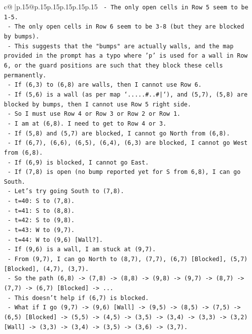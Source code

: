 \documentclass{article}
\begin{document}
{\begin{supertabular}{c@{$\;$}|p{.15\linewidth}@{}p{.15\linewidth}p{.15\linewidth}p{.15\linewidth}p{.15\linewidth}p{.15\linewidth}}
{{{\texttt{  {-} The only open cells in Row 5 seem to be 1{-}5.} \\
\texttt{  {-} The only open cells in Row 6 seem to be 3{-}8 (but they are blocked by bumps).} \\
\texttt{  {-} This suggests that the "bumps" are actually walls, and the map provided in the prompt has a typo where 'p' is used for a wall in Row 6, or the guard positions are such that they block these cells permanently.} \\
\texttt{  {-} If (6,3) to (6,8) are walls, then I cannot use Row 6.} \\
\texttt{  {-} If (5,6) is a wall (as per map `.....\#..\#|`), and (5,7), (5,8) are blocked by bumps, then I cannot use Row 5 right side.} \\
\texttt{  {-} So I must use Row 4 or Row 3 or Row 2 or Row 1.} \\
\texttt{  {-} I am at (6,8). I need to get to Row 4 or 3.} \\
\texttt{  {-} If (5,8) and (5,7) are blocked, I cannot go North from (6,8).} \\
\texttt{  {-} If (6,7), (6,6), (6,5), (6,4), (6,3) are blocked, I cannot go West from (6,8).} \\
\texttt{  {-} If (6,9) is blocked, I cannot go East.} \\
\texttt{  {-} If (7,8) is open (no bump reported yet for S from 6,8), I can go South.} \\
\texttt{  {-} Let's try going South to (7,8).} \\
\texttt{  {-} t=40: S to (7,8).} \\
\texttt{  {-} t=41: S to (8,8).} \\
\texttt{  {-} t=42: S to (9,8).} \\
\texttt{  {-} t=43: W to (9,7).} \\
\texttt{  {-} t=44: W to (9,6) {[}Wall?{]}.} \\
\texttt{  {-} If (9,6) is a wall, I am stuck at (9,7).} \\
\texttt{  {-} From (9,7), I can go North to (8,7), (7,7), (6,7) {[}Blocked{]}, (5,7) {[}Blocked{]}, (4,7), (3,7).} \\
\texttt{  {-} So the path (6,8) {-}> (7,8) {-}> (8,8) {-}> (9,8) {-}> (9,7) {-}> (8,7) {-}> (7,7) {-}> (6,7) {[}Blocked{]} {-}> ...} \\
\texttt{  {-} This doesn't help if (6,7) is blocked.} \\
\texttt{  {-} What if I go (9,7) {-}> (9,6) {[}Wall{]} {-}> (9,5) {-}> (8,5) {-}> (7,5) {-}> (6,5) {[}Blocked{]} {-}> (5,5) {-}> (4,5) {-}> (3,5) {-}> (3,4) {-}> (3,3) {-}> (3,2) {[}Wall{]} {-}> (3,3) {-}> (3,4) {-}> (3,5) {-}> (3,6) {-}> (3,7).} \\
}}}
\end{supertabular}}
\end{document}
